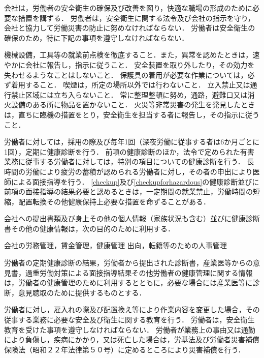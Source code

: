 \documentclass[11pt,a4paper]{jsarticle}
\begin{document}
会社は，労働者の安全衛生の確保及び改善を図り，快適な職場の形成のために必要な措置を講ずる．
\term
労働者は，安全衛生に関する法令及び会社の指示を守り，会社と協力して労働災害の防止に努めなければならない．
\term
労働者は安全衛生の確保のため，特に下記の事項を遵守しなければならない．
\begin{enumerate}
	\itm 機械設備，工具等の就業前点検を徹底すること．また，異常を認めたときは，速やかに会社に報告し，指示に従うこと．
	\itm 安全装置を取り外したり，その効力を失わせるようなことはしないこと．
	\itm 保護具の着用が必要な作業については，必ず着用すること．
	\itm 喫煙は，所定の場所以外では行わないこと．
	\itm 立入禁止又は通行禁止区域には立ち入らないこと．
	\itm 常に整理整頓に努め，通路，避難口又は消火設備のある所に物品を置かないこと．
	\itm 火災等非常災害の発生を発見したときは，直ちに臨機の措置をとり，安全衛生を担当する者に報告し，その指示に従うこと．
\end{enumerate}

労働者に対しては，採用の際及び毎年1回（深夜労働に従事する者は6か月ごとに1回），定期に健康診断を行う．
\label{checkup}
\term
 前項の健康診断のほか，法令で定められた有害業務に従事する労働者に対しては，特別の項目についての健康診断を行う．
\label{checkupforhazardous}
\term
長時間の労働により疲労の蓄積が認められる労働者に対し，その者の申出により医師による面接指導を行う．
\term
\ref{checkup}及び\ref{checkupforhazardous}の健康診断並びに前項の面接指導の結果必要と認めるときは，一定期間の就業禁止，労働時間の短縮，配置転換その他健康保持上必要な措置を命ずることがある．

会社への提出書類及び身上その他の個人情報（家族状況も含む）並びに健康診断書その他の健康情報は，次の目的のために利用する．
\begin{enumerate}
	\itm 会社の労務管理，賃金管理，健康管理
	\itm 出向，転籍等のための人事管理
\end{enumerate}
\term
労働者の定期健康診断の結果，労働者から提出された診断書，産業医等からの意見書，過重労働対策による面接指導結果その他労働者の健康管理に関する情報は，労働者の健康管理のために利用するとともに，必要な場合には産業医等に診断，意見聴取のために提供するものとする．

労働者に対し，雇入れの際及び配置換え等により作業内容を変更した場合，その従事する業務に必要な安全及び衛生に関する教育を行う．
\term
労働者は，安全衛生教育を受けた事項を遵守しなければならない．
労働者が業務上の事由又は通勤により負傷し，疾病にかかり，又は死亡した場合は，労基法及び労働者災害補償保険法（昭和２２年法律第５０号）に定めるところにより災害補償を行う．
\end{document}
